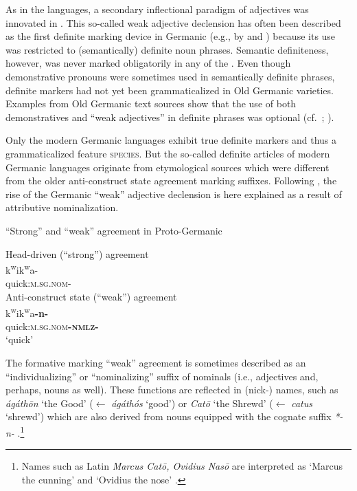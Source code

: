As in the  languages, a secondary inflectional paradigm of adjectives was innovated in . This so-called weak adjective declension has often been described as the first definite marking device in Germanic (e.g., by \citealt{heinrichs1954} and \citealt[170]{ringe2006}) because its use was restricted to (semantically) definite noun phrases. Semantic definiteness, however, was never marked obligatorily in any of the . Even though demonstrative pronouns were sometimes used in semantically definite phrases, definite markers had not yet been grammaticalized in Old Germanic varieties. Examples from Old Germanic text sources show that the use of both demonstratives and “weak adjectives” in definite phrases was optional (cf.~\citealt{philippi1997}; \citealt{heinrichs1954}).

Only the modern Germanic languages exhibit true definite markers and thus a grammaticalized feature \textsc{species}. But the so-called definite articles of modern Germanic languages originate from etymological sources which were different from the older anti\hyp{}construct state agreement marking suffixes. Following \citet[267–268]{riesler2006a}, the rise of the Germanic “weak” adjective declension is here explained as a result of attributive nominalization. 
\begin{exe}
\ex \rm{“Strong” and “weak” agreement in Proto\hyp{}Germanic \citep[169]{ringe2006}}
\begin{xlist}
\ex \rm{Head\hyp{}driven (“strong”) agreement}\\
\gll *k\textsuperscript{w}ik\textsuperscript{w}a-\\
	quick:\textsc{m.sg.nom-}\\
\ex \rm{Anti\hyp{}construct state (“weak”) agreement}\\
\gll *k\textsuperscript{w}ik\textsuperscript{w}a\textbf{-n-}\\
	quick:\textsc{m.sg.nom}\textbf{\textsc{-nmlz-}}\\
\glt	‘quick’
\end{xlist}
\end{exe}
The  formative marking “weak” agreement is sometimes described as an “individualizing” or “nominalizing” suffix of nominals (i.e., adjectives and, perhaps, nouns as well). These functions are reflected in (nick-) names, such as  \textit{ágáthōn} ‘the Good’ ($\leftarrow$ \textit{ágáthós} ‘good’) or  \textit{Catō} ‘the Shrewd’ ($\leftarrow$ \textit{catus} ‘shrewd’) which are also derived from nouns equipped with the cognate suffix \textit{*-n-} \citep[170]{ringe2006}.\footnote{Names such as Latin \textit{Marcus Catō, Ovidius Nasō} are interpreted as ‘Marcus the cunning’ and ‘Ovidius the nose’ \citep[6–7]{nocentini1996}.}

